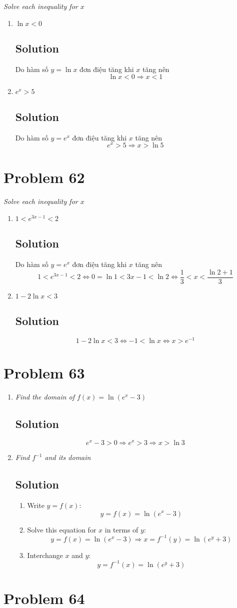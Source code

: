 \documentclass[11pt]{article}
\newcommand{\soln}{\subsection*}
\newcommand{\qn}{\textit}
\begin{document}
\qn{Solve each inequality for $x$}
\begin{enumerate}
	\item \qn{$\ln{x}<0$}
	\soln{Solution}
	Do hàm số $y=\ln{x}$ đơn điệu tăng khi $x$ tăng nên $$\ln{x}<0 \Rightarrow x<1$$
	
	\item \qn{$e^x>5$}
	\soln{Solution}
	Do hàm số $y=e^x$ đơn điệu tăng khi $x$ tăng nên $$e^x>5 \Rightarrow x>\ln5$$
\end{enumerate}


\section*{Problem 62}

\qn{Solve each inequality for $x$}
\begin{enumerate}
	\item \qn{$1 < e^{3x-1} < 2$}
	\soln{Solution}
	Do hàm số $y=e^x$ đơn điệu tăng khi $x$ tăng nên
	$$1 < e^{3x-1} < 2 \Leftrightarrow 0=\ln{1}<3x-1<\ln2 \Leftrightarrow \frac{1}{3}<x<\frac{\ln2+1}{3}$$
	
	\item \qn{$1-2\ln{x}<3$}
	\soln{Solution}
	$$1-2\ln{x}<3 \Leftrightarrow -1<\ln{x} \Leftrightarrow x>e^{-1}$$
\end{enumerate}

\section*{Problem 63}

\begin{enumerate}
	\item \qn{Find the domain of $f(x)=\ln(e^x-3)$}
	\soln{Solution}
	$$e^x-3 >0 \Rightarrow e^x>3 \Rightarrow x > \ln3$$
	
	\item \qn{Find $f^{-1}$ and its domain}
	\soln{Solution}
	\begin{enumerate}
		\item Write $y=f(x)$: $$y=f(x)=\ln(e^x-3)$$
		\item Solve this equation for $x$ in terms of $y$: $$y=f(x)=\ln(e^x-3) \Rightarrow x=f^{-1}(y)=\ln(e^y+3)$$
		\item Interchange $x$ and $y$: $$y=f^{-1}(x)=\ln(e^y+3)$$
	\end{enumerate}
\end{enumerate}

\section*{Problem 64}
\end{document}
